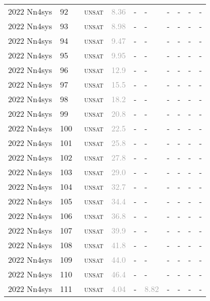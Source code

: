 \begin{center}
{\begin{longtable}{@{}llllllllll@{}}
2022 Nn4sys & 92 & ~\textsc{unsat} & \textcolor{darkgray}{8.36} & - & - & - & - & - & - \\
2022 Nn4sys & 93 & ~\textsc{unsat} & \textcolor{darkgray}{8.98} & - & - & - & - & - & - \\
2022 Nn4sys & 94 & ~\textsc{unsat} & \textcolor{darkgray}{9.47} & - & - & - & - & - & - \\
2022 Nn4sys & 95 & ~\textsc{unsat} & \textcolor{darkgray}{9.95} & - & - & - & - & - & - \\
2022 Nn4sys & 96 & ~\textsc{unsat} & \textcolor{darkgray}{12.9} & - & - & - & - & - & - \\
2022 Nn4sys & 97 & ~\textsc{unsat} & \textcolor{darkgray}{15.5} & - & - & - & - & - & - \\
2022 Nn4sys & 98 & ~\textsc{unsat} & \textcolor{darkgray}{18.2} & - & - & - & - & - & - \\
2022 Nn4sys & 99 & ~\textsc{unsat} & \textcolor{darkgray}{20.8} & - & - & - & - & - & - \\
2022 Nn4sys & 100 & ~\textsc{unsat} & \textcolor{darkgray}{22.5} & - & - & - & - & - & - \\
2022 Nn4sys & 101 & ~\textsc{unsat} & \textcolor{darkgray}{25.8} & - & - & - & - & - & - \\
2022 Nn4sys & 102 & ~\textsc{unsat} & \textcolor{darkgray}{27.8} & - & - & - & - & - & - \\
2022 Nn4sys & 103 & ~\textsc{unsat} & \textcolor{darkgray}{29.0} & - & - & - & - & - & - \\
2022 Nn4sys & 104 & ~\textsc{unsat} & \textcolor{darkgray}{32.7} & - & - & - & - & - & - \\
2022 Nn4sys & 105 & ~\textsc{unsat} & \textcolor{darkgray}{34.4} & - & - & - & - & - & - \\
2022 Nn4sys & 106 & ~\textsc{unsat} & \textcolor{darkgray}{36.8} & - & - & - & - & - & - \\
2022 Nn4sys & 107 & ~\textsc{unsat} & \textcolor{darkgray}{39.9} & - & - & - & - & - & - \\
2022 Nn4sys & 108 & ~\textsc{unsat} & \textcolor{darkgray}{41.8} & - & - & - & - & - & - \\
2022 Nn4sys & 109 & ~\textsc{unsat} & \textcolor{darkgray}{44.0} & - & - & - & - & - & - \\
2022 Nn4sys & 110 & ~\textsc{unsat} & \textcolor{darkgray}{46.4} & - & - & - & - & - & - \\
2022 Nn4sys & 111 & ~\textsc{unsat} & \textcolor{darkgray}{4.04} & - & \textcolor{darkgray}{8.82} & - & - & - & - \\

\end{longtable}}
\end{center}
